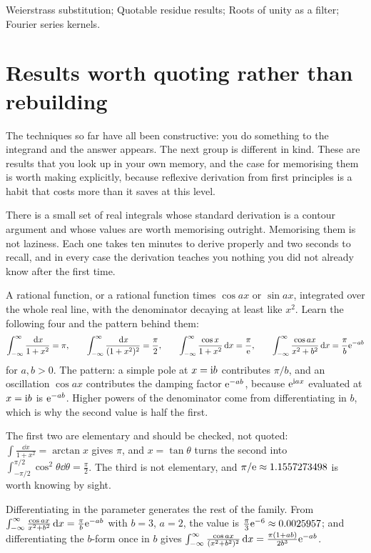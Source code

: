 \begin{seealsob}Weierstrass substitution; Quotable residue results; Roots of unity as a filter; Fourier series kernels.\end{seealsob}

\section{Results worth quoting rather than rebuilding}

The techniques so far have all been constructive: you do something to the integrand and the answer appears. The next group is different in kind. These are results that you look up in your own memory, and the case for memorising them is worth making explicitly, because reflexive derivation from first principles is a habit that costs more than it saves at this level.

There is a small set of real integrals whose standard derivation is a contour argument and whose values are worth memorising outright. Memorising them is not laziness. Each one takes ten minutes to derive properly and two seconds to recall, and in every case the derivation teaches you nothing you did not already know after the first time.

\cue A rational function, or a rational function times $\cos ax$ or $\sin ax$, integrated over the whole real line, with the denominator decaying at least like $x^{2}$.
\method Learn the following four and the pattern behind them:
\[\int_{-\infty}^{\infty}\frac{\,\mathrm{d} x}{1+x^{2}}=\pi,\qquad \int_{-\infty}^{\infty}\frac{\,\mathrm{d} x}{(1+x^{2})^{2}}=\frac{\pi}{2},\qquad
\int_{-\infty}^{\infty}\frac{\cos x}{1+x^{2}}\,\mathrm{d} x=\frac{\pi}{\mathrm{e}},\qquad
\int_{-\infty}^{\infty}\frac{\cos ax}{x^{2}+b^{2}}\,\mathrm{d} x=\frac{\pi}{b}\mathrm{e}^{-ab}\]
for $a,b>0$. The pattern: a simple pole at $x=\mathrm{i} b$ contributes $\pi/b$, and an oscillation $\cos ax$ contributes the damping factor $\mathrm{e}^{-ab}$, because $\mathrm{e}^{\mathrm{i} a x}$ evaluated at $x=\mathrm{i} b$ is $\mathrm{e}^{-ab}$. Higher powers of the denominator come from differentiating in $b$, which is why the second value is half the first.

\begin{worked}
The first two are elementary and should be checked, not quoted: $\int\frac{\dd x}{1+x^{2}}=\arctan x$ gives $\pi$, and $x=\tan\theta$ turns the second into $\int_{-\pi/2}^{\pi/2}\cos^{2}\theta\dd\theta=\tfrac\pi2$. The third is not elementary, and $\pi/\mathrm{e}\approx1.1557273498$ is worth knowing by sight.

Differentiating in the parameter generates the rest of the family. From $\int_{-\infty}^{\infty}\frac{\cos ax}{x^{2}+b^{2}}\,\mathrm{d} x=\frac{\pi}{b}\mathrm{e}^{-ab}$ with $b=3$, $a=2$, the value is $\tfrac\pi3\mathrm{e}^{-6}\approx0.0025957$; and differentiating the $b$-form once in $b$ gives $\int_{-\infty}^{\infty}\frac{\cos ax}{(x^{2}+b^{2})^{2}}\,\mathrm{d} x=\frac{\pi(1+ab)}{2b^{3}}\mathrm{e}^{-ab}$.
\end{worked}

